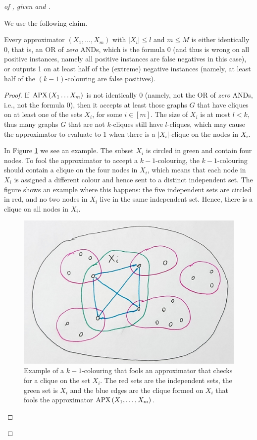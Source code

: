 \begin{proof}[of , given   and ]
\

We use the following claim. 

\begin{claim}\label{cla:internal-in-monotone-lower-bound}
 Every approximator  \APPX$\left(X_1, \ldots, X_m\right)$ with 
  $\left|X_i\right| \leq l$ and $m \leq M$ is either identically 0, that is, an OR of \emph{zero} ANDs, which is the formula $0$ (and thus is wrong on all positive instances, namely all positive instances are false negatives in this case), or outputs 1 on at least half of the (extreme) negative instances (namely, at least half of the $(k-1)$-colouring  are false positives).

\end{claim}
\begin{proof}
If $\operatorname{\mathrm{APX}}\left(X_1 \ldots X_m\right)$ is not identically 0 (namely, not the OR of \emph{zero} ANDs, i.e., not the formula $0$), then it accepts at least those graphs $G$ that have cliques on at least one of the sets $X_i$, for some $i\in[m]$. The size of $X_i$ is at most $ l<k$, thus many graphs $G$ that are not $k$-cliques still have $l$-cliques, which may cause the approximator to evaluate to 1 when there is a $|X_i|$-clique on the nodes in $X_i$.


In Figure \ref{fig:R(xi)}  we see an example. The subset $X_i$ is circled in green and contain four nodes. To fool the approximator to accept a $k-1$-colouring, the $k-1$-colouring should contain a clique on the four nodes in $X_i$, which means that each node in $X_i$ is assigned a different colour and hence sent to a distinct independent set. The figure shows an example where this happens: the five independent sets are circled in red, and no two nodes in $X_i$ live in the same independent set. Hence, there is a clique on all nodes in $X_i$.
\begin{figure}[H] 
    \centering
    \includegraphics[width=.6\linewidth]{images/R(Xi)-lemma-cliques.png}
        \caption{Example of a $k-1$-colouring that fools an approximator that checks for a clique on  the set $X_i$. The red sets are the independent sets, the green set is $X_i$ and the blue edges are the clique formed on $X_i$ that fools the approximator $\operatorname{\mathrm{APX}}\left(X_1, \ldots, X_m\right)$.}
    \label{fig:R(xi)}
\end{figure}


\end{proof}
\end{proof}
